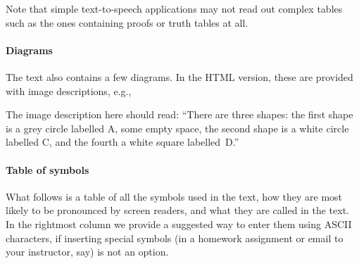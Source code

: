 Note that simple text-to-speech applications may not read out complex
tables such as the ones containing proofs or truth tables at all.

\paragraph{Diagrams}

The text also contains a few diagrams. In the HTML version, these are
provided with image descriptions, e.g.,
\begin{center}
\end{center}
The image description here should read: ``There are three shapes: the
first shape is a grey circle labelled A, some empty space, the second
shape is a white circle labelled C, and the fourth a white square
labelled~D.''

\paragraph{Table of symbols}

What follows is a table of all the symbols used in the text, how they
are most likely to be pronounced by screen readers, and what they are
called in the text. In the rightmost column we provide a suggested way
to enter them using ASCII characters, if inserting special symbols (in
a homework assignment or email to your instructor, say) is not an
option.

